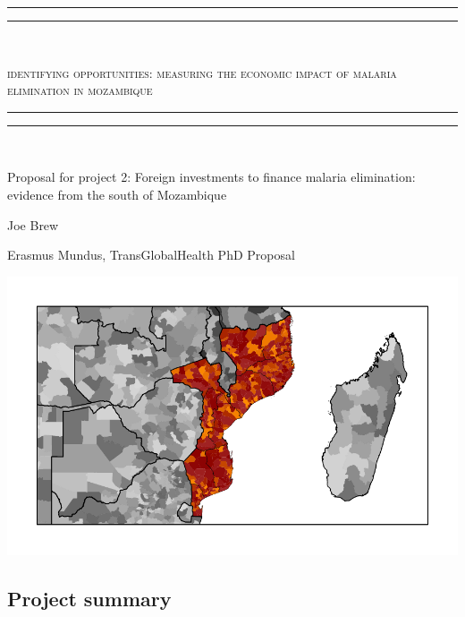 \documentclass{article}
\begin{document}





\begin{center}

\rule{\textwidth}{1.6pt}\vspace*{-\baselineskip}\vspace*{2pt} %
\rule{\textwidth}{0.4pt}\\[\baselineskip] %


\begin{LARGE}
\scshape{identifying opportunities: measuring the economic impact of malaria elimination in mozambique}
\end{LARGE}


\rule{\textwidth}{0.4pt}\vspace*{-\baselineskip}\vspace{3.2pt} %
\rule{\textwidth}{1.6pt}\\[\baselineskip] %

\begin{large}
Proposal for project 2: Foreign investments to finance malaria elimination: evidence from the south of Mozambique
\end{large}

\vspace{5mm}

\begin{Large}
Joe Brew
\end{Large}
\vspace{3mm}

\begin{large}
Erasmus Mundus, TransGlobalHealth PhD Proposal 
\end{large}

\vspace{10mm}
\includegraphics{protocol-001}

\vspace{5mm}


\subsection*{Project summary}

\end{center}
\end{document}
